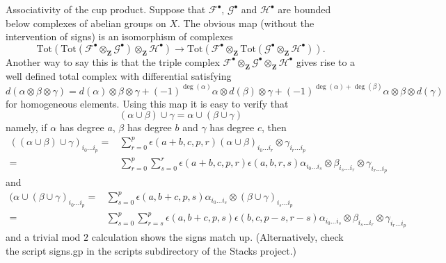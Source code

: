 \medskip\noindent
Associativity of the cup product. Suppose that ${\mathcal F}^\bullet$,
${\mathcal G}^\bullet$ and ${\mathcal H}^\bullet$ are bounded below
complexes of abelian groups on $X$. The obvious map
(without the intervention of signs) is an isomorphism
of complexes
$$
\text{Tot}(
\text{Tot}({\mathcal F}^\bullet \otimes_{\mathbf Z} {\mathcal G}^\bullet)
\otimes_{\mathbf Z} {\mathcal H}^\bullet
)
\longrightarrow
\text{Tot}(
{\mathcal F}^\bullet \otimes_{\mathbf Z}
\text{Tot}({\mathcal G}^\bullet \otimes_{\mathbf Z} {\mathcal H}^\bullet)
).
$$
Another way to say this is that the triple complex
${\mathcal F}^\bullet \otimes_{\mathbf Z} {\mathcal G}^\bullet
\otimes_{\mathbf Z} {\mathcal H}^\bullet$ gives rise to a well defined
total complex with differential satisfying
$$
d(\alpha \otimes \beta \otimes \gamma) =
d(\alpha) \otimes \beta \otimes \gamma +
(-1)^{\deg(\alpha)} \alpha \otimes d(\beta) \otimes \gamma +
(-1)^{\deg(\alpha) + \deg(\beta)} \alpha \otimes \beta \otimes d(\gamma)
$$
for homogeneous elements. Using this map it is easy to verify that
$$
(\alpha \cup \beta) \cup \gamma = \alpha \cup ( \beta \cup \gamma)
$$
namely, if $\alpha$ has degree $a$, $\beta$ has degree $b$ and
$\gamma$ has degree $c$, then
\begin{align*}
((\alpha \cup \beta) \cup \gamma)_{i_0 \ldots i_p}
= &
\sum\nolimits_{r = 0}^p
\epsilon(a + b, c, p, r)
(\alpha \cup \beta)_{i_0 \ldots i_r} \otimes \gamma_{i_r \ldots i_p}
\\
= &
\sum\nolimits_{r = 0}^p
\sum\nolimits_{s = 0}^r
\epsilon(a + b, c, p, r) \epsilon(a, b, r, s)
\alpha_{i_0 \ldots i_s} \otimes
\beta_{i_s \ldots i_r} \otimes
\gamma_{i_r \ldots i_p}
\end{align*}
and
\begin{align*}
(\alpha \cup (\beta \cup \gamma)_{i_0\ldots i_p}
= &
\sum\nolimits_{s = 0}^p
\epsilon(a, b + c, p, s)
\alpha_{i_0 \ldots i_s} \otimes (\beta \cup \gamma)_{i_s \ldots i_p}
\\
= &
\sum\nolimits_{s = 0}^p
\sum\nolimits_{r = s}^p
\epsilon(a, b + c, p, s) \epsilon(b, c, p - s, r - s)
\alpha_{i_0 \ldots i_s} \otimes \beta_{i_s \ldots i_r} \otimes
\gamma_{i_r \ldots i_p}
\end{align*}
and a trivial mod $2$ calculation shows the signs match up.
(Alternatively, check the script signs.gp in the scripts subdirectory
of the Stacks project.)

